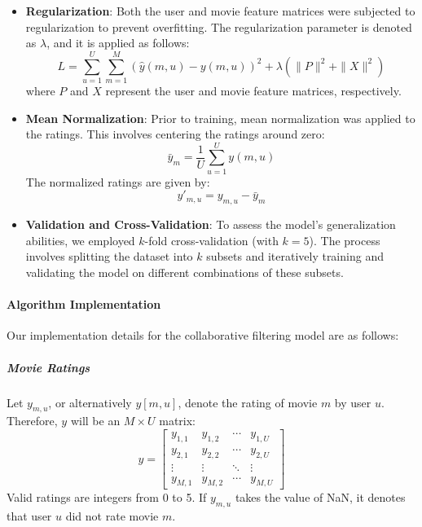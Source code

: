 \documentclass[a3paper,12pt]{article}
\begin{document}
\begin{itemize}
    \item \textbf{Regularization}: Both the user and movie feature matrices were subjected to regularization to prevent overfitting. The regularization parameter is denoted as \( \lambda \), and it is applied as follows:
    \begin{equation}
        L = \sum_{u=1}^{U} \sum_{m=1}^{M} \left( \hat{y}(m,u) - y(m,u) \right)^2 + \lambda \left( \|P\|^2 + \|X\|^2 \right) \tag{1}
    \end{equation}
    where \(P\) and \(X\) represent the user and movie feature matrices, respectively.

    \item \textbf{Mean Normalization}: Prior to training, mean normalization was applied to the ratings. This involves centering the ratings around zero:
    \begin{equation}
        \bar{y}_m = \frac{1}{U} \sum_{u=1}^{U} y(m,u) \tag{2}
    \end{equation}
    The normalized ratings are given by:
    \begin{equation}
        y'_{m,u} = y_{m,u} - \bar{y}_m \tag{3}
    \end{equation}

    \item \textbf{Validation and Cross-Validation}: To assess the model’s generalization abilities, we employed \( k \)-fold cross-validation (with \( k = 5 \)). The process involves splitting the dataset into \( k \) subsets and iteratively training and validating the model on different combinations of these subsets.
\end{itemize}

\paragraph{Algorithm Implementation}
Our implementation details for the collaborative filtering model are as follows:

\subparagraph{Movie Ratings}
Let \( y_{m,u} \), or alternatively \( y[m,u] \), denote the rating of movie \( m \) by user \( u \). Therefore, \( y \) will be an \( M \times U \) matrix:
\begin{equation}
y =
\begin{bmatrix}
y_{1,1} & y_{1,2} & \cdots & y_{1,U} \\
y_{2,1} & y_{2,2} & \cdots & y_{2,U} \\
\vdots & \vdots & \ddots & \vdots \\
y_{M,1} & y_{M,2} & \cdots & y_{M,U}
\end{bmatrix} \tag{4}
\end{equation}
Valid ratings are integers from 0 to 5. If \( y_{m,u} \) takes the value of NaN, it denotes that user \( u \) did not rate movie \( m \).
\end{document}

